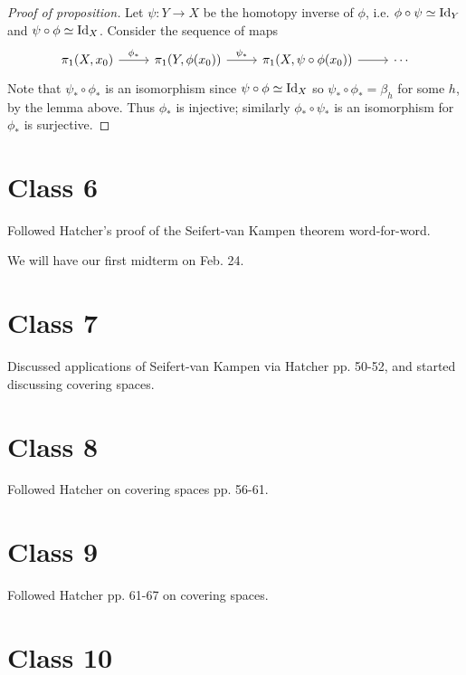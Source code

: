 \documentclass{../mathnotes}
\begin{document}
\begin{proof}[Proof of proposition]
    Let $\psi:Y\to X$ be the homotopy inverse of $\phi$, i.e. $\phi\circ\psi\simeq\operatorname{Id}_Y$ and $\psi\circ\phi\simeq\operatorname{Id}_X$.
    Consider the sequence of maps
    \begin{equation*}
        \begin{tikzcd}
            \pi_1(X,x_0)\arrow{r}{\phi_*}&\pi_1(Y,\phi(x_0))\arrow{r}{\psi_*}&\pi_1(X,\psi\circ\phi(x_0))\arrow{r}&\cdots
        \end{tikzcd}
    \end{equation*}
    Note that $\psi_*\circ\phi_*$ is an isomorphism since $\psi\circ\phi\simeq\operatorname{Id}_X$ so $\psi_*\circ\phi_*=\beta_h$
    for some $h$, by the lemma above. Thus $\phi_*$ is injective; similarly $\phi_*\circ\psi_*$ is an isomorphism
    for $\phi_*$ is surjective.
\end{proof}

\section*{Class 6}

Followed Hatcher's proof of the Seifert-van Kampen theorem word-for-word.
\begin{rem}
    We will have our first midterm on Feb. 24.
\end{rem}

\section*{Class 7}

Discussed applications of Seifert-van Kampen via Hatcher pp. 50-52, and started
discussing covering spaces.

\section*{Class 8}

Followed Hatcher on covering spaces pp. 56-61.

\section*{Class 9}

Followed Hatcher pp. 61-67 on covering spaces.

\section*{Class 10}
\end{document}
